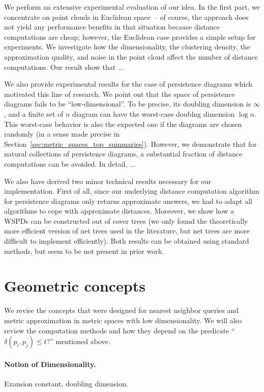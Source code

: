 \documentclass[10pt]{article}
\newcommand{\metric}{\delta}
\begin{document}
We perform an extensive experimental evaluation of our idea.
In the first part, we concentrate on point clouds in Euclidean space~--
of course, the approach does not yield any performance benefits in that
situation because distance computations are cheap; however, the Euclidean
case provides a simple setup for experiments.
We investigate how the dimensionality, the clustering density, 
the approximation quality, and noise 
in the point cloud affect the number of distance computations.
Our result show that $\ldots$

We also provide experimental results for the case of persistence diagrams
which motivated this line of research. We point out that the space of
persistence diagrams fails to be ``low-dimensional''. To be precise,
its doubling dimension is $\infty$, and a finite set of $n$ diagram
can have the worst-case doublng dimension $\log n$. This worst-case
behavior is also the expected one if the diagrams are chosen randomly
(in a sense made precise in Section~\ref{sec:metric_spaces_top_summaries}). 
However, we demonstrate that
for natural collections of persistence diagrams, a substantial fraction
of distance computations can be avoided. In detail, $\ldots$

We also have derived two minor technical results necessary for 
our implementation. First of all, since our underlying distance computation
algorithm for persistence diagrams only returns approximate answers,
we had to adapt all algorithms to cope with approximate distances.
Moreover, we show how a WSPDs can be constructed
out of cover trees (we only found 
the theoretically more efficient version of
net trees used in the literature, but net trees are more difficult to implement
efficiently). Both results can be obtained using standard methods, 
but seem to be not present in prior work.

\section{Geometric concepts}

We revise the concepts that were designed for nearest neighbor queries
and metric approximation in metric spaces with low dimensionality.
We will also review the computation methods and how they depend
on the predicate ``$\metric(p_i,p_j)\leq t$?'' mentioned above.

\paragraph{Notion of Dimensionality.}
%
Exansion constant, doubling dimension.
\end{document}
